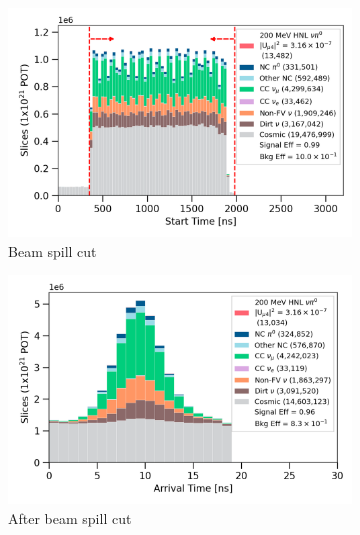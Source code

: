 \begin{figure}[hb!]
        \centering
        \begin{subfigure}[b]{0.495\textwidth}
            \centering
            \includegraphics[width=\textwidth]{beamspill}
            \caption{Beam spill cut}%
            \label{fig:beamspill_cut}
        \end{subfigure}
        \hfill
        \begin{subfigure}[b]{0.495\textwidth}  
            \centering 
            \includegraphics[width=\textwidth]{beam_bucket_post_beamspill}
            \caption{After beam spill cut}%
            \label{fig:bb_beamspill}
        \end{subfigure}
        \begin{subfigure}[b]{0.495\textwidth}   
            \centering 

\end{subfigure}
\end{figure}
